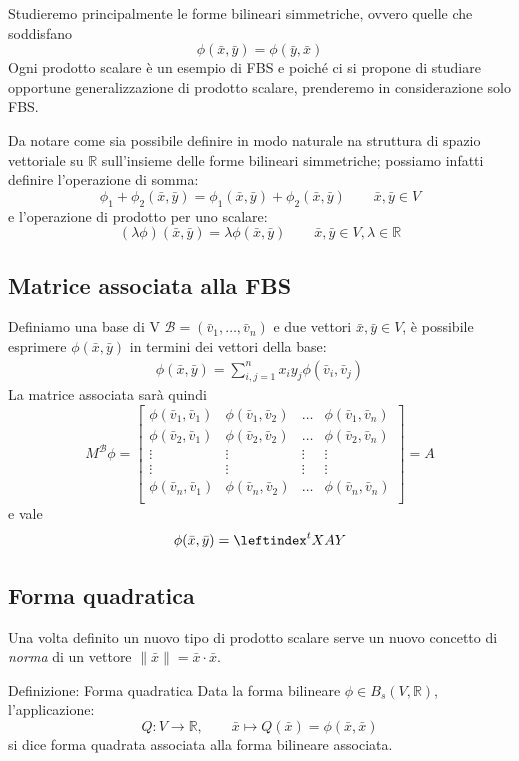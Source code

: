 \documentclass[x11names]{article}
\begin{document}
\noindent
Studieremo principalmente le forme bilineari simmetriche, ovvero quelle che soddisfano
\[
\phi(\bar{x},\bar{y}) = \phi (\bar{y},\bar{x})
\]
Ogni prodotto scalare è un esempio di FBS e poiché ci si propone di studiare opportune generalizzazione di prodotto scalare, prenderemo in considerazione solo FBS.

Da notare come sia possibile definire in modo naturale na struttura di spazio vettoriale su $\mathbb{R}$ sull'insieme delle forme bilineari simmetriche; possiamo infatti definire l'operazione di somma:
\[
\phi _{1} + \phi_2(\bar{x},\bar{y}) = \phi_{1}(\bar{x},\bar{y}) + \phi_{2}(\bar{x},\bar{y}) \qquad \bar{x},\bar{y} \in V
\]
e l'operazione di prodotto per uno scalare:
\[
(\lambda\phi)(\bar{x},\bar{y}) = \lambda\phi(\bar{x},\bar{y})\qquad \bar{x},\bar{y} \in V, \lambda \in \mathbb{R}
\]
\subsection{Matrice associata alla FBS}
Definiamo una base di V $\mathcal{B} = \left(\bar{v}_{1},\dots,\bar{v}_{n}\right)$ e due vettori $\bar{x},\bar{y}\in V$, è possibile esprimere $\phi (\bar{x},\bar{y})$ in termini dei vettori della base:
\begin{align*}
	\phi(\bar{x},\bar{y}) = \sum_{i,j=1}^{n}x_{i}y_{j}\phi(\bar{v}_{i},\bar{v}_{j})
\end{align*}
La matrice associata sarà quindi
\[
M^{\mathcal{B}}\phi = 
\begin{bmatrix}
	\phi(\bar{v}_{1},\bar{v}_{1}) & \phi(\bar{v}_{1},\bar{v}_{2}) & \dots & \phi(\bar{v}_{1},\bar{v}_{n})  \\
	\phi(\bar{v}_{2},\bar{v}_{1}) & \phi(\bar{v}_{2},\bar{v}_{2}) & \dots & \phi(\bar{v}_{2},\bar{v}_{n})  \\
	\vdots & \vdots & \vdots & \vdots \\
	\vdots & \vdots & \vdots & \vdots \\
	\phi(\bar{v}_{n},\bar{v}_{1}) & \phi(\bar{v}_{n},\bar{v}_{2}) & \dots & \phi(\bar{v}_{n},\bar{v}_{n})  \\
\end{bmatrix} = A
\]
e vale
\[
\phi(\bar{x},\bar{y}) = \leftindex^{t}{X}AY
\]

\subsection{Forma quadratica}
Una volta definito un nuovo tipo di prodotto scalare serve un nuovo concetto di \textit{norma} di un vettore $\|\bar{x}\| = \bar{x} \cdot \bar{x}$.
	\begin{center}
	\colorbox{myblue}{\begin{minipage}{5.75in}
			\begin{blues}{Definizione: Forma quadratica}
			Data la forma bilineare $\phi \in B_{s}(V,\mathbb{R})$, l'applicazione:
			\[
			Q:V\to \mathbb{R}, \qquad \bar{x} \mapsto Q(\bar{x}) = \phi(\bar{x},\bar{x})
			\]
			si dice forma quadrata associata alla forma bilineare associata.
			\end{blues}
	\end{minipage}}       
\end{center}
\end{document}
